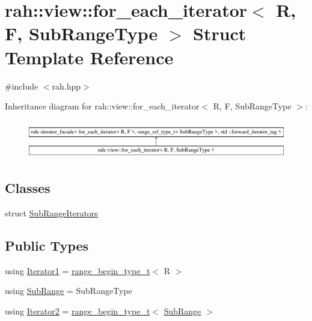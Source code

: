 \hypertarget{structrah_1_1view_1_1for__each__iterator}{}\section{rah\+::view\+::for\+\_\+each\+\_\+iterator$<$ R, F, Sub\+Range\+Type $>$ Struct Template Reference}
\label{structrah_1_1view_1_1for__each__iterator}


{\ttfamily \#include $<$rah.\+hpp$>$}

Inheritance diagram for rah\+::view\+::for\+\_\+each\+\_\+iterator$<$ R, F, Sub\+Range\+Type $>$\+:\begin{figure}[H]
\begin{center}
\leavevmode
\includegraphics[height=1.674140cm]{structrah_1_1view_1_1for__each__iterator}
\end{center}
\end{figure}
\subsection*{Classes}
\begin{DoxyCompactItemize}
\item 
struct \mbox{\hyperlink{structrah_1_1view_1_1for__each__iterator_1_1_sub_range_iterators}{Sub\+Range\+Iterators}}
\end{DoxyCompactItemize}
\subsection*{Public Types}
\begin{DoxyCompactItemize}
\item 
using \mbox{\hyperlink{structrah_1_1view_1_1for__each__iterator_a173ab775f95bdff3b3756714690be546}{Iterator1}} = \mbox{\hyperlink{namespacerah_a28aff4eeddcece6be65ff0b956d32d4a}{range\+\_\+begin\+\_\+type\+\_\+t}}$<$ R $>$
\item 
using \mbox{\hyperlink{structrah_1_1view_1_1for__each__iterator_a468008aa3006424aa1a71f7ca6a5d8bd}{Sub\+Range}} = Sub\+Range\+Type
\item 
using \mbox{\hyperlink{structrah_1_1view_1_1for__each__iterator_a13108a8db132a8157375f81cf9b12ce1}{Iterator2}} = \mbox{\hyperlink{namespacerah_a28aff4eeddcece6be65ff0b956d32d4a}{range\+\_\+begin\+\_\+type\+\_\+t}}$<$ \mbox{\hyperlink{structrah_1_1view_1_1for__each__iterator_a468008aa3006424aa1a71f7ca6a5d8bd}{Sub\+Range}} $>$
\end{DoxyCompactItemize}

